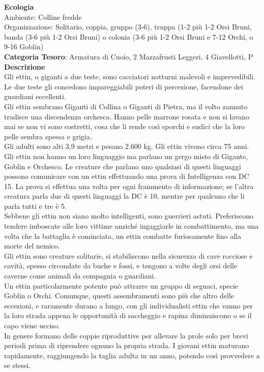 \begin{multicols}{2}
{\textbf{Ecologia}\\
Ambiente: Colline fredde\\
Organizzazione: Solitario, coppia, gruppo (3-6), truppa (1-2 più 1-2 Orsi Bruni, banda (3-6 più 1-2 Orsi Bruni) o colonia (3-6 più 1-2 Orsi Bruni e 7-12 Orchi, o 9-16 Goblin)\\
\textbf{Categoria Tesoro}: Armatura di Cuoio, 2 Mazzafrusti Leggeri, 4 Giavellotti, P\\
\textbf{Descrizione}\\
Gli ettin, o giganti a due teste, sono cacciatori notturni malevoli e imprevedibili. Le due teste gli concedono impareggiabili poteri di percezione, facendone dei guardiani eccellenti.\\
Gli ettin sembrano Giganti di Collina o Giganti di Pietra, ma il volto zannuto tradisce una discendenza orchesca. Hanno pelle marrone rosata e non si lavano mai se non vi sono costretti, cosa che li rende così sporchi e sudici che la loro pelle sembra spessa e grigia.\\
Gli adulti sono alti 3,9 metri e pesano 2.600 kg. Gli ettin vivono circa 75 anni.\\
Gli ettin non hanno un loro linguaggio ma parlano un gergo misto di Gigante, Goblin e Orchesco. Le creature che parlano uno qualsiasi di questi linguaggi possono comunicare con un ettin effettuando una prova di Intelligenza con DC 15. La prova si effettua una volta per ogni frammento di informazione; se l'altra creatura parla due di questi linguaggi la DC è 10, mentre per qualcuno che li parla tutti e tre è 5.\\
Sebbene gli ettin non siano molto intelligenti, sono guerrieri astuti. Preferiscono tendere imboscate alle loro vittime anziché ingaggiarle in combattimento, ma una volta che la battaglia è cominciata, un ettin combatte furiosamente fino alla morte del nemico.\\
Gli ettin sono creature solitarie, si stabiliscono nella sicurezza di cave rocciose e cavità, spesso circondate da buche e fossi, e tengono a volte degli orsi delle caverne come animali da compagnia o guardiani.\\
Un ettin particolarmente potente può attrarre un gruppo di seguaci, specie Goblin o Orchi. Comunque, questi assembramenti sono più che altro delle eccezioni, e raramente durano a lungo, con gli individualisti ettin che vanno per la loro strada appena le opportunità di saccheggio e rapina diminuiscono o se il capo viene ucciso.\\
In genere formano delle coppie riproduttive per allevare la prole solo per brevi periodi prima di riprendere ognuno la propria strada. I giovani ettin maturano rapidamente, raggiungendo la taglia adulta in un anno, potendo così provvedere a se stessi.

}
\end{multicols}
